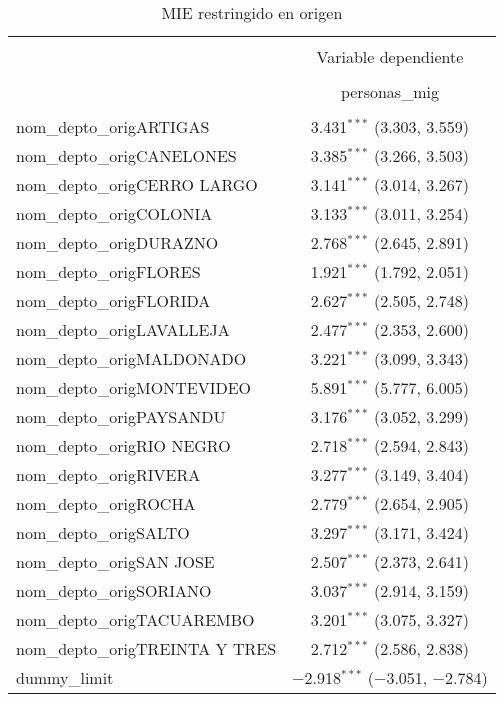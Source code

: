 
\begin{table}[H] \centering 
  \caption{MIE restringido en origen} 
  \label{} 
\begin{tabular}{@{\extracolsep{5pt}}lc} 
\\[-1.8ex]\hline 
\hline \\[-1.8ex] 
 & \multicolumn{1}{c}{Variable dependiente} \\ 
\cline{2-2} 
\\[-1.8ex] & personas\_mig \\ 
\hline \\[-1.8ex] 
 nom\_depto\_origARTIGAS & 3.431$^{***}$ (3.303, 3.559) \\ 
  nom\_depto\_origCANELONES & 3.385$^{***}$ (3.266, 3.503) \\ 
  nom\_depto\_origCERRO LARGO & 3.141$^{***}$ (3.014, 3.267) \\ 
  nom\_depto\_origCOLONIA & 3.133$^{***}$ (3.011, 3.254) \\ 
  nom\_depto\_origDURAZNO & 2.768$^{***}$ (2.645, 2.891) \\ 
  nom\_depto\_origFLORES & 1.921$^{***}$ (1.792, 2.051) \\ 
  nom\_depto\_origFLORIDA & 2.627$^{***}$ (2.505, 2.748) \\ 
  nom\_depto\_origLAVALLEJA & 2.477$^{***}$ (2.353, 2.600) \\ 
  nom\_depto\_origMALDONADO & 3.221$^{***}$ (3.099, 3.343) \\ 
  nom\_depto\_origMONTEVIDEO & 5.891$^{***}$ (5.777, 6.005) \\ 
  nom\_depto\_origPAYSANDU & 3.176$^{***}$ (3.052, 3.299) \\ 
  nom\_depto\_origRIO NEGRO & 2.718$^{***}$ (2.594, 2.843) \\ 
  nom\_depto\_origRIVERA & 3.277$^{***}$ (3.149, 3.404) \\ 
  nom\_depto\_origROCHA & 2.779$^{***}$ (2.654, 2.905) \\ 
  nom\_depto\_origSALTO & 3.297$^{***}$ (3.171, 3.424) \\ 
  nom\_depto\_origSAN JOSE & 2.507$^{***}$ (2.373, 2.641) \\ 
  nom\_depto\_origSORIANO & 3.037$^{***}$ (2.914, 3.159) \\ 
  nom\_depto\_origTACUAREMBO & 3.201$^{***}$ (3.075, 3.327) \\ 
  nom\_depto\_origTREINTA Y TRES & 2.712$^{***}$ (2.586, 2.838) \\ 
  dummy\_limit & $-$2.918$^{***}$ ($-$3.051, $-$2.784) \\ 

\end{tabular}
\end{table}
